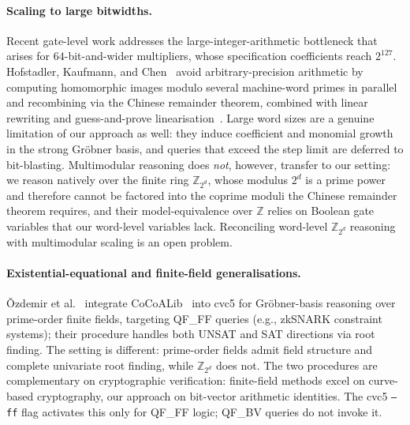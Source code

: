 \documentclass[runningheads]{llncs}
\begin{document}
\paragraph{Scaling to large bitwidths.}
Recent gate-level work addresses the large-integer-arithmetic
bottleneck that arises for $64$-bit-and-wider multipliers, whose
specification coefficients reach $2^{127}$. Hofstadler, Kaufmann, and
Chen~\cite{hofstadler2026} avoid arbitrary-precision arithmetic by
computing homomorphic images modulo several machine-word primes in
parallel and recombining via the Chinese remainder theorem, combined
with linear rewriting and guess-and-prove
linearisation~\cite{kaufmann2019,ritirc2017,ritirc2018}. Large word
sizes are a genuine limitation of our approach as well: they induce
coefficient and monomial growth in the strong Gr\"obner basis, and
queries that exceed the step limit are deferred to bit-blasting.
Multimodular reasoning does \emph{not}, however, transfer to our
setting: we reason natively over the finite ring $\mathbb{Z}_{2^d}$,
whose modulus $2^d$ is a prime power and therefore cannot be factored
into the coprime moduli the Chinese remainder theorem requires, and
their model-equivalence over $\mathbb{Z}$ relies on Boolean gate
variables that our word-level variables lack. Reconciling word-level
$\mathbb{Z}_{2^d}$ reasoning with multimodular scaling is an open
problem.

\paragraph{Existential-equational and finite-field
generalisations.}
\v{O}zdemir et al.~\cite{Ozdemir23cvc5}
integrate CoCoALib~\cite{abbott:cocoalib} into cvc5 for
Gr\"obner-basis reasoning over prime-order finite fields,
targeting QF\_FF queries (e.g., zkSNARK constraint systems);
their procedure handles both UNSAT and SAT directions via root
finding. The setting is different: prime-order fields admit
field structure and complete univariate root finding, while
$\mathbb{Z}_{2^d}$ does not. The two procedures are complementary
on cryptographic verification: finite-field methods excel on
curve-based cryptography, our approach on bit-vector arithmetic
identities. The cvc5 \texttt{--ff} flag activates this only for
QF\_FF logic; QF\_BV queries do not invoke it.
\end{document}
